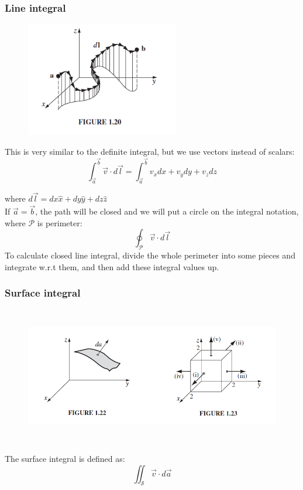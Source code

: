 \documentclass[12pt,a4paper,twoside]{article}
\begin{document}
	\subsubsection{Line integral}
	\begin{figure}[ht]
		\centering
		\includegraphics[height = 5cm]{lineintegral.png}
		\label{fig:1.20}
	\end{figure}
	\noindent This is very similar to the definite integral, but we use vectors instead of scalars:
	\begin{equation}
		\int_{\overrightarrow{a}}^{\overrightarrow{b}}\overrightarrow{v}\cdot d\overrightarrow{l}=\int_{\overrightarrow{a}}^{\overrightarrow{b}}v_xdx+v_ydy+v_zdz
	\end{equation}
	
	where \(d\overrightarrow{l}=dx\hat{x}+dy\hat{y}+dz\hat{z}\)\\
	
	\noindent If \(\overrightarrow{a}=\overrightarrow{b}\), the path will be closed and we will put a circle on the integral notation, where \(\mathcal{P}\) is perimeter:
	\[\oint_\mathcal{P}\overrightarrow{v}\cdot d\overrightarrow{l} \]
	To calculate closed line integral, divide the whole perimeter into some pieces and integrate w.r.t them, and then add these integral values up.
	
	\subsubsection{Surface integral}
	\begin{figure}[ht]
		\centering
		\includegraphics[height = 6cm]{surfaceintegral.png}
		\label{fig: 1.22/23}
	\end{figure}
	\noindent The surface integral is defined as:
	\begin{equation}
		\iint_\mathcal{S} \overrightarrow{v} \cdot d\overrightarrow{a}
	\end{equation}
	
\end{document}
